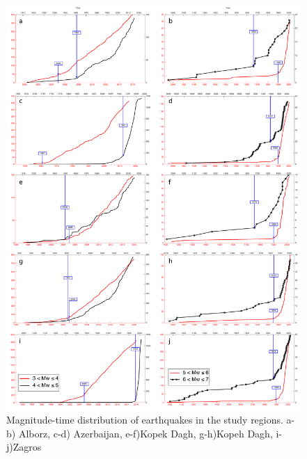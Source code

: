 \begin{figure} [!ht]
\centering
\includegraphics[scale=0.28]{figures/pdf/comp_test_all_mag.pdf} 
\caption{Magnitude-time distribution of earthquakes in the study regions. a-b) Alborz, c-d) Azerbaijan, e-f)Kopek Dagh, g-h)Kopeh Dagh, i-j)Zagros}
\label{fig:comp_test_all_mag}
\end{figure}



